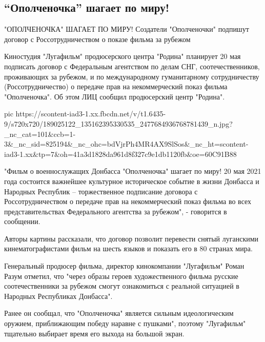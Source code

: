  
 
 
 
 
\subsection{\enquote{Ополченочка} шагает по миру!}

"ОПОЛЧЕНОЧКА" ШАГАЕТ ПО МИРУ! Создатели "Ополченочки" подпишут договор с Россотрудничеством о показе фильма за рубежом

Киностудия "Лугафильм" продюсерского центра "Родина" планирует 20 мая подписать
договор с Федеральным агентством по делам СНГ, соотечественников, проживающих
за рубежом, и по международному гуманитарному сотрудничеству
(Россотрудничество) о передаче прав на некоммерческий показ фильма
"Ополченочка". Об этом ЛИЦ сообщил продюсерский центр "Родина".

\ifcmt
  pic https://scontent-iad3-1.xx.fbcdn.net/v/t1.6435-9/s720x720/189025122_135162395330535_2477684936768781439_n.jpg?_nc_cat=101&ccb=1-3&_nc_sid=825194&_nc_ohc=bdVjrPh4MR4AX9SlSos&_nc_ht=scontent-iad3-1.xx&tp=7&oh=41a3d1828da961d8f327c9e1db1120fb&oe=60C91B88
\fi

"Фильм о военнослужащих Донбасса "Ополченочка" шагает по миру! 20 мая 2021 года
состоится важнейшее культурное историческое событие в жизни Донбасса и Народных
Республик – торжественное подписание договора с Россотрудничеством о передаче
прав на некоммерческий показ фильма во всех представительствах Федерального
агентства за рубежом", - говорится в сообщении.

Авторы картины рассказали, что договор позволит перевести снятый луганскими
кинематографистами фильм на шесть языков и показать его в 80 странах мира.

Генеральный продюсер фильма, директор кинокомпании "Лугафильм" Роман Разум
отметил, что "через образы героев художественного фильма русские
соотечественники за рубежом смогут ознакомиться с реальной ситуацией в Народных
Республиках Донбасса".

Ранее он сообщал, что "Ополченочка" является сильным идеологическим оружием,
приближающим победу наравне с пушками", поэтому "Лугафильм" тщательно выбирает
время его выхода на большой экран. 

